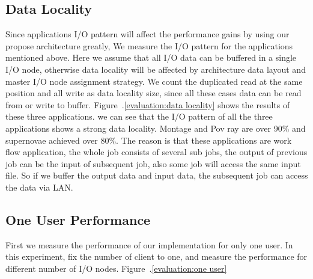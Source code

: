 \subsection{Data Locality}
Since applications I/O pattern will affect the performance gains by using our propose architecture
greatly, We measure the I/O pattern for the applications mentioned above.
Here we assume that all I/O data can be buffered in a single I/O node, otherwise data locality will
be affected by architecture data layout and master I/O node assignment strategy.
We count the duplicated read at the same position and all write as data locality size, since all
these cases data can be read from or write to buffer.
Figure~.\ref{evaluation:data locality} shows the results of these three applications. we can see
that the I/O pattern of all the three applications shows a strong data locality. Montage and Pov ray
are over 90\% and supernovae achieved over 80\%.
The reason is that these applications are work flow application, the whole job consists of several
sub jobs, the output of previous job can be the input of subsequent job, also some job will access
the same input file.
So if we buffer the output data and input data, the subsequent job can access the data via LAN.

\subsection{One User Performance}
First we measure the performance of our implementation for only one user.
In this experiment, fix the number of client to one, and measure the performance for different
number of I/O nodes. Figure~.\ref{evaluation:one user}